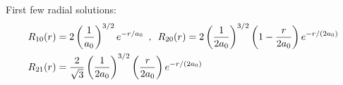First few radial solutions:
\begin{align*}
    R_{10}(r) &= 2 \left( \frac{1}{a_0} \right)^{3/2} e^{-r/a_0}
    \hspace{5pt} , \hspace{5pt}
    R_{20}(r) = 2 \left( \frac{1}{2 a_0} \right)^{3/2} \left( 1 - \frac{r}{2 a_0} \right) e^{-r/(2a_0)}
    \\
    R_{21}(r) &= \frac{2}{\sqrt{3}} \left( \frac{1}{2a_0} \right)^{3/2} \left( \frac{r}{2 a_0} \right) e^{-r/(2 a_0)} 
\end{align*}





